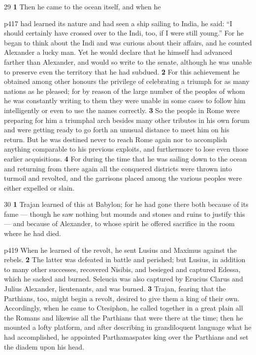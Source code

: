 29
\textbf{1} Then he came to the ocean itself, and when he

p417 had learned its nature and had seen a ship sailing to India, he said: ``I should certainly have crossed over to the Indi, too, if I were still young.'' For he began to think about the Indi and was curious about their affairs, and he counted Alexander a lucky man. Yet he would declare that he himself had advanced farther than Alexander, and would so write to the senate, although he was unable to preserve even the territory that he had subdued. \textbf{2} For this achievement he obtained among other honours the privilege of celebrating a triumph for as many nations as he pleased; for by reason of the large number of the peoples of whom he was constantly writing to them they were unable in some cases to follow him intelligently or even to use the names correctly. \textbf{3} So the people in Rome were preparing for him a triumphal arch besides many other tributes in his own forum and were getting ready to go forth an unusual distance to meet him on his return. But he was destined never to reach Rome again nor to accomplish anything comparable to his previous exploits, and furthermore to lose even those earlier acquisitions. \textbf{4} For during the time that he was sailing down to the ocean and returning from there again all the conquered districts were thrown into turmoil and revolted, and the garrisons placed among the various peoples were either expelled or slain.

30
\textbf{1} Trajan learned of this at Babylon; for he had gone there both because of its fame \texthebrew{—} though he saw nothing but mounds and stones and ruins to justify this \texthebrew{—} and because of Alexander, to whose spirit he offered sacrifice in the room where he had died.

p419 When he learned of the revolt, he sent Lusius and Maximus against the rebels. \textbf{2} The latter was defeated in battle and perished; but Lusius, in addition to many other successes, recovered Nisibis, and besieged and captured Edessa, which he sacked and burned. Seleucia was also captured by Erucius Clarus and Julius Alexander, lieutenants, and was burned. \textbf{3} Trajan, fearing that the Parthians, too, might begin a revolt, desired to give them a king of their own. Accordingly, when he came to Ctesiphon, he called together in a great plain all the Romans and likewise all the Parthians that were there at the time; then he mounted a lofty platform, and after describing in grandiloquent language what he had accomplished, he appointed Parthamaspates king over the Parthians and set the diadem upon his head.

